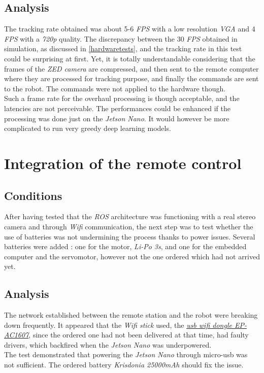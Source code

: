 		\subsection{Analysis}
		
		The tracking rate obtained was about 5-6 \textit{FPS} with 
		a low resolution \textit{VGA} and 4 \textit{FPS} with a \textit{720p} quality.
		The discrepancy between the 30 \textit{FPS} obtained
		in simulation, as discussed in \vref{hardwaretests}, and the 
		tracking rate in this test could be surprising at first.
		Yet, it is totally understandable considering that the 
		frames of the \textit{ZED camera} are compressed, and then sent
		to the remote computer where they are processed for tracking 
		purpose, and finally the commands are sent to the robot. 
		The commands were not applied to the hardware though.
		\\\indent Such a frame rate for the overhaul processing 
		is though acceptable, and the latencies are not 
		perceivable. The performances could be enhanced if the 
		processing was done just on the \textit{Jetson Nano}.
		It would however be more complicated to run very 
		greedy deep learning models.

	\section{Integration of the remote control}
	
		\subsection{Conditions}
		
		After having tested that the \textit{ROS} architecture
		was functioning with a real stereo camera and through 
		\textit{Wifi} communication,  the next step was to test
		whether the use of batteries was not undermining the 
		process thanks to power issues. Several batteries 
		were added : one for the motor, \textit{Li-Po 3s}, and 
		one for the embedded computer and the servomotor, however 
		not the one ordered which had not arrived yet. 
	
		\subsection{Analysis}
		
		The network established between 
		the remote station and the robot were breaking down frequently.
		It appeared that the \textit{Wifi stick} used, the
		\href{https://www.miniinthebox.com/en/p/5ghz-usb-wifi-adapter-600mbps-wifi-antenna-2dbi-support-windows-mac-802-11ac-usb-network-card-wifi-dongle-for-desktop-laptop-pc\_p5957285.html?prm=2.3.5.1}{\textit{usb wifi dongle EP-AC1607}}, since the 
		ordered one had not been delivered at that time, had 
		faulty drivers, which backfired when the \textit{Jetson Nano} was
		underpowered.
		\\\indent The test demonstrated that powering the 
		\textit{Jetson Nano} through micro-usb was not 
		sufficient. The ordered battery \textit{Krisdonia 25000mAh}
		should fix the issue.
		
